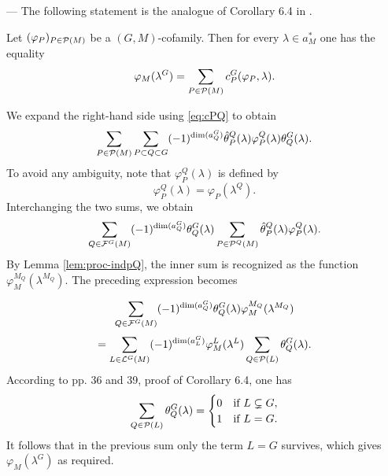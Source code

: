 \begin{paragr} --- The following statement is the analogue of Corollary 6.4 in \cite{trace_inv}.
  
\begin{theoreme}\label{thm:ppal}
    Let $(\varphi_P)_{P\in \mathcal{P}(M)}$ be a $(G,M)$-cofamily. Then for every $\lambda\in a_M^*$ one has the equality
$$\varphi_M(\lambda^G)=\sum_{P\in \mathcal{P}(M)} c_P^G(\varphi_P,\lambda).$$
\end{theoreme}

\begin{preuve}
We expand the right-hand side using \eqref{eq:cPQ} to obtain 
$$    \sum_{P\in \mathcal{P}(M)} \sum_{P\subset Q\subset G} (-1)^{\dim(a_Q^G)} \hat{\theta}_P^Q(\lambda) \varphi_P^Q(\lambda) \theta_Q^G(\lambda).$$
To avoid any ambiguity, note that $\varphi_P^Q(\lambda)$ is defined by
$$\varphi_P^Q(\lambda)=\varphi_P(\lambda^Q).$$
Interchanging the two sums, we obtain 
$$\sum_{Q\in \mathcal{F}^G(M)} (-1)^{\dim(a_Q^G)} \theta_Q^G(\lambda) \sum_{P\in \mathcal{P}^Q(M)} \hat{\theta}_P^Q(\lambda) \varphi_P^Q(\lambda).$$
By Lemma \ref{lem:proc-indpQ}, the inner sum is recognized as the function $\varphi_M^{M_Q}(\lambda^{M_Q})$. The preceding expression becomes

$$\sum_{Q\in \mathcal{F}^G(M)} (-1)^{\dim(a_Q^G)} \theta_Q^G(\lambda)\varphi_{M}^{M_Q}(\lambda^{M_Q})$$
$$=\sum_{L\in \mathcal{L}^G(M)} (-1)^{\dim(a_L^G)}\varphi_{M}^{L}(\lambda^L)\sum_{Q\in \mathcal{P}(L)} \theta_Q^G(\lambda).$$
According to \cite{trace_inv} pp. 36 and 39, proof of Corollary 6.4, one has 
$$\sum_{Q\in \mathcal{P}(L)} \theta_Q^G(\lambda)= \begin{cases} 0 & \text{if } L\subsetneq G, \\ 1 & \text{if } L=G. \end{cases} $$
It follows that in the previous sum only the term $L=G$ survives, which gives $\varphi_M(\lambda^G)$ as required.
\end{preuve}
\end{paragr}

